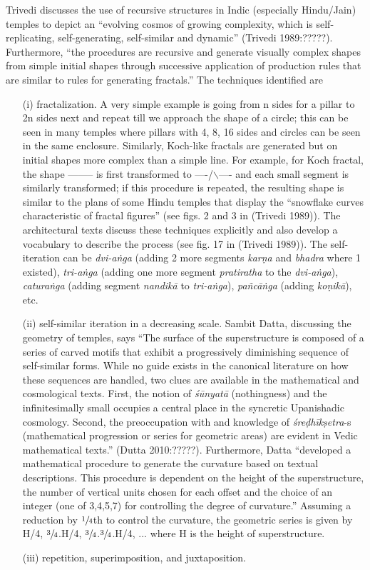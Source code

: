 Trivedi discusses the use of recursive structures in Indic (especially Hindu/Jain) temples to depict an “evolving cosmos of growing complexity, which is self-replicating, self-generating, self-similar and dynamic” (Trivedi 1989:?????). Furthermore, “the procedures are recursive and generate visually complex shapes from simple initial shapes through successive application of production rules that are similar to rules for generating fractals.” The techniques identified are 
\begin{itemize}
\item[(i)] fractalization. A very simple example is going from n sides for a pillar to 2n sides next and repeat till we approach the shape of a circle; this can be seen in many temples where pillars with 4, 8, 16 sides and circles can be seen in the same enclosure. Similarly, Koch-like fractals are generated but on initial shapes more complex than a simple line. For example, for Koch fractal, the shape -------- is first transformed to ----/$\backslash$---- and each small segment is similarly transformed; if this procedure is repeated, the resulting shape is similar to the plans of some Hindu temples that display the “snowflake curves characteristic of fractal figures” (see figs. 2 and 3 in (Trivedi 1989)). The architectural texts discuss these techniques explicitly and also develop a vocabulary to describe the process (see fig. 17 in (Trivedi 1989)). The self-iteration can be \textsl{dvi-aṅga} (adding 2 more segments \textsl{karṇa} and \textsl{bhadra} where 1 existed), \textsl{tri-aṅga} (adding one more segment \textsl{pratiratha} to the \textsl{dvi-aṅga}), \textsl{caturaṅga} (adding segment \textsl{nandikā} to \textsl{tri-aṅga}), \textsl{pañcāṅga} (adding \textsl{koṇikā}), etc. 

\item[(ii)] self-similar iteration in a decreasing scale. Sambit Datta, discussing the geometry of temples, says “The surface of the superstructure is composed of a series of carved motifs that exhibit a progressively diminishing sequence of self-similar forms. While no guide exists in the canonical literature on how these sequences are handled, two clues are available in the mathematical and cosmological texts. First, the notion of \textsl{śūnyatā} (nothingness) and the infinitesimally small occupies a central place in the syncretic Upanishadic cosmology. Second, the preoccupation with and knowledge of \textsl{śreḍhīkṣetra}-s (mathematical progression or series for geometric areas) are evident in Vedic mathematical texts.” (Dutta 2010:?????). Furthermore, Datta “developed a mathematical procedure to generate the curvature based on textual descriptions. This procedure is dependent on the height of the superstructure, the number of vertical units chosen for each offset and the choice of an integer (one of 3,4,5,7) for controlling the degree of curvature.” Assuming a reduction by $\sfrac{1}{4}$th to control the curvature, the geometric series is given by H/4, $\sfrac{3}{4}$.H/4, $\sfrac{3}{4}$.$\sfrac{3}{4}$.H/4, ... where H is the height of superstructure.

\item[(iii)] repetition, superimposition, and juxtaposition.
\end{itemize}

